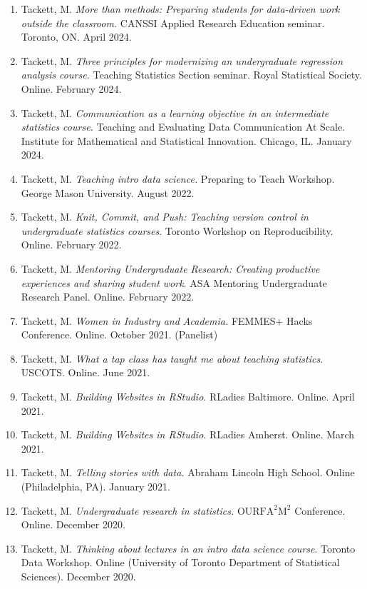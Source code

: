 \documentclass[11pt,dvipsnames]{article}
\begin{document}
\begin{enumerate}
\def\labelenumi{\arabic{enumi}.}
\item
  Tackett, M. \emph{More than methods: Preparing students for
  data-driven work outside the classroom.} CANSSI Applied Research
  Education seminar. Toronto, ON. April 2024.
\item
  Tackett, M. \emph{Three principles for modernizing an undergraduate
  regression analysis course.} Teaching Statistics Section seminar.
  Royal Statistical Society. Online. February 2024.
\item
  Tackett, M. \emph{Communication as a learning objective in an
  intermediate statistics course.} Teaching and Evaluating Data
  Communication At Scale. Institute for Mathematical and Statistical
  Innovation. Chicago, IL. January 2024.
\item
  Tackett, M. \emph{Teaching intro data science.} Preparing to Teach
  Workshop. George Mason University. August 2022.
\item
  Tackett, M. \emph{Knit, Commit, and Push: Teaching version control in
  undergraduate statistics courses}. Toronto Workshop on
  Reproducibility. Online. February 2022.
\item
  Tackett, M. \emph{Mentoring Undergraduate Research: Creating
  productive experiences and sharing student work}. ASA Mentoring
  Undergraduate Research Panel. Online. February 2022.
\item
  Tackett, M. \emph{Women in Industry and Academia.} FEMMES+ Hacks
  Conference. Online. October 2021. (Panelist)
\item
  Tackett, M. \emph{What a tap class has taught me about teaching
  statistics}. USCOTS. Online. June 2021.
\item
  Tackett, M. \emph{Building Websites in RStudio}. RLadies Baltimore.
  Online. April 2021.
\item
  Tackett, M. \emph{Building Websites in RStudio}. RLadies Amherst.
  Online. March 2021.
\item
  Tackett, M. \emph{Telling stories with data.} Abraham Lincoln High
  School. Online (Philadelphia, PA). January 2021.
\item
  Tackett, M. \emph{Undergraduate research in statistics.}
  \(\text{OURFA}^2\text{M}^2\) Conference. Online. December 2020.
\item
  Tackett, M. \emph{Thinking about lectures in an intro data science
  course}. Toronto Data Workshop. Online (University of Toronto
  Department of Statistical Sciences). December 2020.

\end{enumerate}
\end{document}
